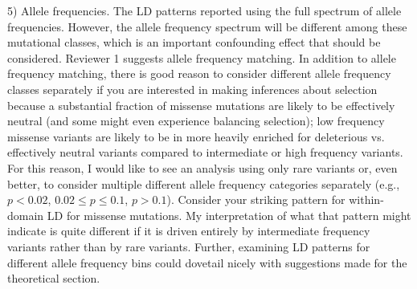 \documentclass{article}
\begin{document}
5) Allele frequencies. The LD patterns reported using the full spectrum of
allele frequencies. However, the allele frequency spectrum will be different
among these mutational classes, which is an important confounding effect that
should be considered. Reviewer 1 suggests allele frequency matching. In
addition to allele frequency matching, there is good reason to consider
different allele frequency classes separately if you are interested in making
inferences about selection because a substantial fraction of missense mutations
are likely to be effectively neutral (and some might even experience balancing
selection); low frequency missense variants are likely to be in more heavily
enriched for deleterious vs. effectively neutral variants compared to
intermediate or high frequency variants. For this reason, I would like to see
an analysis using only rare variants or, even better, to consider multiple
different allele frequency categories separately (e.g., $p < 0.02$, $0.02 \leq
p \leq 0.1$, $p > 0.1$). Consider your striking pattern for within-domain LD
for missense mutations. My interpretation of what that pattern might indicate
is quite different if it is driven entirely by intermediate frequency variants
rather than by rare variants. Further, examining LD patterns for different
allele frequency bins could dovetail nicely with suggestions made for the
theoretical section.
\end{document}
